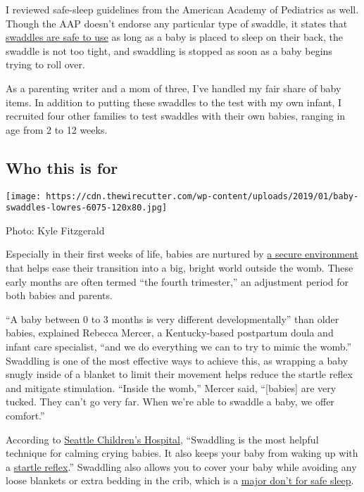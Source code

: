 I reviewed safe-sleep guidelines from the American Academy of Pediatrics
as well. Though the AAP doesn't endorse any particular type of swaddle,
it states that
\href{https://www.healthychildren.org/English/ages-stages/baby/sleep/Pages/A-Parents-Guide-to-Safe-Sleep.aspx}{swaddles
are safe to use} as long as a baby is placed to sleep on their back, the
swaddle is not too tight, and swaddling is stopped as soon as a baby
begins trying to roll over.

As a parenting writer and a mom of three, I've handled my fair share of
baby items. In addition to putting these swaddles to the test with my
own infant, I recruited four other families to test swaddles with their
own babies, ranging in age from 2 to 12 weeks.

\hypertarget{who-this-is-for}{%
\subsection{Who this is for}\label{who-this-is-for}}

\texttt{[image: https://cdn.thewirecutter.com/wp-content/uploads/2019/01/baby-swaddles-lowres-6075-120x80.jpg]}

Photo: Kyle Fitzgerald

Especially in their first weeks of life, babies are nurtured by
\href{https://www.washingtonpost.com/news/parenting/wp/2018/04/26/swaddling-your-newborn-why-to-do-it-and-how-to-do-it-right/?noredirect=on\&utm_term=.a9599ef29f7e}{a
secure environment} that helps ease their transition into a big, bright
world outside the womb. These early months are often termed ``the fourth
trimester,'' an adjustment period for both babies and parents.

``A baby between 0 to 3 months is very different developmentally'' than
older babies, explained Rebecca Mercer, a Kentucky-based postpartum
doula and infant care specialist, ``and we do everything we can to try
to mimic the womb.'' Swaddling is one of the most effective ways to
achieve this, as wrapping a baby snugly inside of a blanket to limit
their movement helps reduce the startle reflex and mitigate stimulation.
``Inside the womb,'' Mercer said, ``{[}babies{]} are very tucked. They
can't go very far. When we're able to swaddle a baby, we offer
comfort.''

According to
\href{https://www.seattlechildrens.org/conditions/a-z/crying-baby-before-3-months-old/}{Seattle
Children's Hospital}, ``Swaddling is the most helpful technique for
calming crying babies. It also keeps your baby from waking up with a
\href{https://www.whattoexpect.com/baby-behavior/newborn-reflexes.aspx}{startle
reflex}.'' Swaddling also allows you to cover your baby while avoiding
any loose blankets or extra bedding in the crib, which is a
\href{http://pediatrics.aappublications.org/content/138/5/e20162938}{major
don't for safe sleep}.

